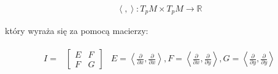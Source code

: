 \documentclass{article}
\theoremstyle{plain}
\theoremstyle{definition}
\theoremstyle{definition}
\begin{document}
\begin{align*}
    \left<, \right>: T_pM \times T_pM \to \mathbb{R}
\end{align*}

\noindent który wyraża się za pomocą macierzy:

\begin{align*}
    \begin{split}
       I = &\left[
    \begin{array}{cc}
        E & F \\
        F & G
    \end{array}
    \right]
    \end{split}
    \begin{split}
     E = \left< \frac{\partial}{\partial x}, \frac{\partial}{\partial x} \right>, F = \left< \frac{\partial}{\partial x}, \frac{\partial}{\partial y} \right>, G = \left< \frac{\partial}{\partial y}, \frac{\partial}{\partial y} \right>
    \end{split}
\end{align*}
\end{document}
